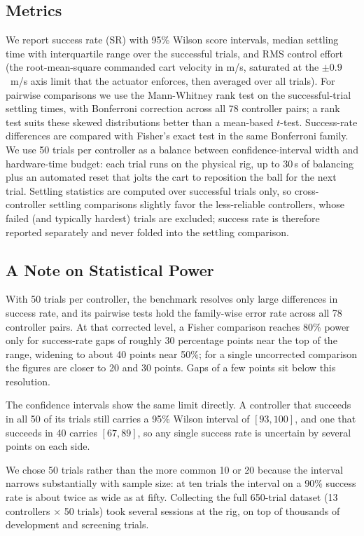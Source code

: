 \subsection{Metrics}

We report success rate (SR) with 95\% Wilson score intervals, median settling time with interquartile range over the successful trials, and RMS control effort (the root-mean-square commanded cart velocity in m/s, saturated at the $\pm 0.9$~m/s axis limit that the actuator enforces, then averaged over all trials).
For pairwise comparisons we use the Mann-Whitney rank test on the successful-trial settling times, with Bonferroni correction across all 78 controller pairs; a rank test suits these skewed distributions better than a mean-based $t$-test.
Success-rate differences are compared with Fisher's exact test in the same Bonferroni family.
We use 50 trials per controller as a balance between confidence-interval width and hardware-time budget: each trial runs on the physical rig, up to 30\,s of balancing plus an automated reset that jolts the cart to reposition the ball for the next trial.
Settling statistics are computed over successful trials only, so cross-controller settling comparisons slightly favor the less-reliable controllers, whose failed (and typically hardest) trials are excluded; success rate is therefore reported separately and never folded into the settling comparison.

\subsection{A Note on Statistical Power}

With 50 trials per controller, the benchmark resolves only large differences in success rate, and its pairwise tests hold the family-wise error rate across all 78 controller pairs.
At that corrected level, a Fisher comparison reaches 80\% power only for success-rate gaps of roughly 30 percentage points near the top of the range, widening to about 40 points near 50\%; for a single uncorrected comparison the figures are closer to 20 and 30 points.
Gaps of a few points sit below this resolution.

The confidence intervals show the same limit directly.
A controller that succeeds in all 50 of its trials still carries a 95\% Wilson interval of $[93, 100]$, and one that succeeds in 40 carries $[67, 89]$, so any single success rate is uncertain by several points on each side.

We chose 50 trials rather than the more common 10 or 20 because the interval narrows substantially with sample size: at ten trials the interval on a 90\% success rate is about twice as wide as at fifty.
Collecting the full 650-trial dataset (13 controllers $\times$ 50 trials) took several sessions at the rig, on top of thousands of development and screening trials.

